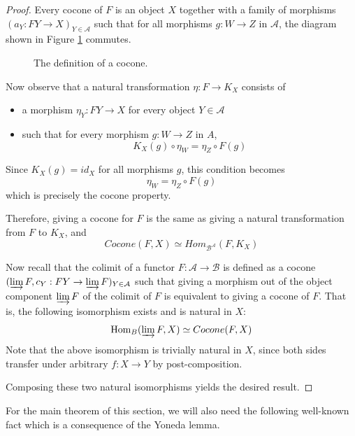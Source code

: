 \documentclass{msthesis}
\theoremstyle{definition}
\newcommand{\mcB}{\mathcal{B}}
\newcommand{\mcA}{\mathcal{A}}
\newcommand{\colim}{\varinjlim}
\newcommand{\Hom}{\mathrm{Hom}}
\begin{document}
\begin{proof}
    Every cocone of $F$ is an object $X$ together with a family of morphisms $(a_Y : F Y \to X)_{Y \in \mcA}$ such that for all morphisms $g : W \to Z$ in $\mcA$, the diagram shown in Figure \ref{fig:cocone} commutes.
    \begin{figure}[htbp]
    \centering
        \caption{The definition of a cocone.}
        \label{fig:cocone}
    \end{figure}

    Now observe that a natural transformation $\eta : F \to K_X$ consists of 
    \begin{itemize}[nosep]
        \item a morphism $\eta_Y : F Y \to X$ for every object $Y \in \mcA$
        \item such that for every morphism $g : W \to Z$ in $A$,
        \[ K_X(g) \circ \eta_W = \eta_Z \circ F(g) \]
    \end{itemize}
    Since $K_X(g) = id_X$ for all morphisms $g$, this condition becomes
    \[ \eta_W = \eta_Z \circ F(g) \]
    which is precisely the cocone property.

    Therefore, giving a cocone for $F$ is the same as giving a natural transformation from $F$ to $K_X$, and
    \[ Cocone(F, X) \simeq Hom_{\mcB^\mcA}(F, K_X) \]

    Now recall that the colimit of a functor $F : \mcA \to \mcB$ is defined as a cocone $(\colim F, c_Y : F Y \to \colim F)_{Y \in \mcA}$ such that giving a morphism out of the object component $\colim F$ of the colimit of $F$ is equivalent to giving a cocone of $F$. That is, the following isomorphism exists and is natural in $X$:
    \[ \Hom_B(\colim F, X) \simeq Cocone(F, X) \]
    Note that the above isomorphism is trivially natural in $X$, since both sides transfer under arbitrary $f : X \to Y$ by post-composition.

    Composing these two natural isomorphisms yields the desired result.
\end{proof}

For the main theorem of this section, we will also need the following well-known fact which is a consequence of the Yoneda lemma.
\end{document}
